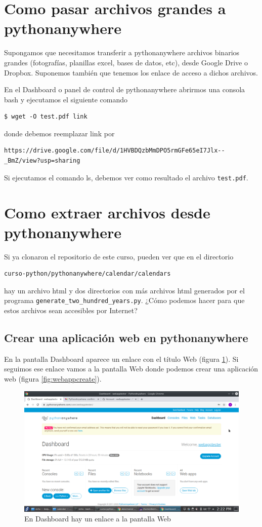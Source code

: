\documentclass[10pt,a4paper]{article}
\begin{document}
\section{Como pasar archivos grandes a pythonanywhere}

Supongamos que necesitamos transferir a pythonanywhere archivos binarios grandes (fotografías, planillas excel, bases de datos, etc), desde Google Drive o Dropbox. Suponemos también que tenemos los enlace de acceso a dichos archivos. 

En el Dashboard o panel de control de pythonanywhere abrirmos una consola bash y ejecutamos el
siguiente comando
\begin{verbatim}
$ wget -O test.pdf link
\end{verbatim}
donde debemos reemplazar link por
\begin{verbatim}
https://drive.google.com/file/d/1HVBDQzbMmDPO5rmGFe65eI7Jlx--_BmZ/view?usp=sharing
\end{verbatim}

Si ejecutamos el comando ls, debemos ver como resultado el archivo \verb|test.pdf|.


\section{Como extraer archivos desde pythonanywhere}

Si ya clonaron el repositorio de este curso, pueden ver que en el directorio
\begin{verbatim}
curso-python/pythonanywhere/calendar/calendars
\end{verbatim}
hay un archivo html y dos directorios con más archivos html generados por el programa \verb|generate_two_hundred_years.py|. ¿Cómo podemos hacer para que estos archivos sean accesibles por Internet?

\subsection{Crear una aplicación web en pythonanywhere}

En la pantalla Dashboard aparece un enlace con el título Web (figura \ref{fig:webappdashboard}). Si seguimos ese enlace vamos a la pantalla Web donde podemos crear una aplicación web (figura \ref{fig:webappcreate}).

\begin{figure}
	\centering
	\includegraphics[width=0.7\linewidth]{sc/webapp_dashboard}
	\caption{En Dashboard hay un enlace a la pantalla Web}
	\label{fig:webappdashboard}
\end{figure}
\end{document}
